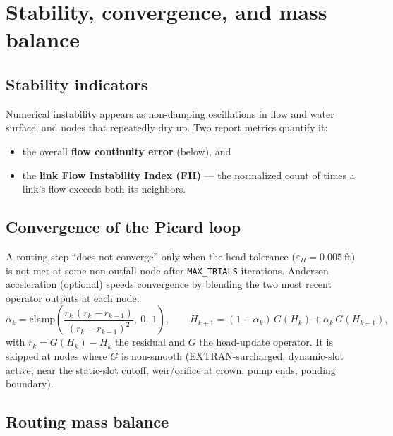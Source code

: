 \documentclass[11pt,a4paper]{article}
\newcommand{\ft}{\mathrm{ft}}
\begin{document}
\section{Stability, convergence, and mass balance}

\subsection{Stability indicators}

Numerical instability appears as non-damping oscillations in flow and water
surface, and nodes that repeatedly dry up. Two report metrics quantify it:
\begin{itemize}[nosep]
  \item the overall \textbf{flow continuity error} (below), and
  \item the \textbf{link Flow Instability Index (FII)} --- the normalized count
        of times a link's flow exceeds both its neighbors.
\end{itemize}

\subsection{Convergence of the Picard loop}

A routing step ``does not converge'' only when the head tolerance
($\varepsilon_H = 0.005\ \ft$) is not met at some non-outfall node after
\texttt{MAX\_TRIALS} iterations. Anderson acceleration (optional) speeds
convergence by blending the two most recent operator outputs at each node:
\begin{equation}
  \alpha_k = \mathrm{clamp}\!\left(
    \frac{r_k\,(r_k - r_{k-1})}{(r_k - r_{k-1})^{2}},\ 0,\ 1\right),
  \qquad
  H_{k+1} = (1-\alpha_k)\,G(H_k) + \alpha_k\,G(H_{k-1}),
\end{equation}
with $r_k = G(H_k) - H_k$ the residual and $G$ the head-update operator. It is
skipped at nodes where $G$ is non-smooth (EXTRAN-surcharged, dynamic-slot
active, near the static-slot cutoff, weir/orifice at crown, pump ends, ponding
boundary).

\subsection{Routing mass balance}
\end{document}
